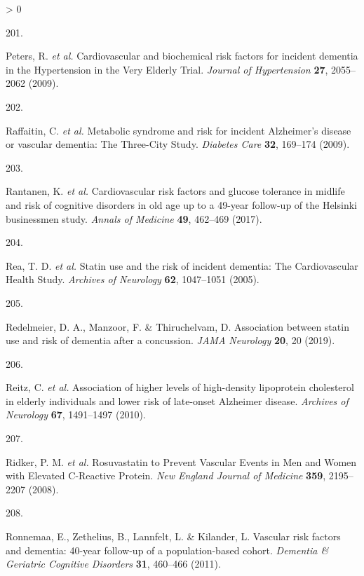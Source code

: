 \documentclass[a4paper, twoside]{templates/ociamthesis}
\newlength{\cslhangindent}
\newlength{\csllabelwidth}
\newenvironment{CSLReferences}[3] %
 {%
  \setlength{\parindent}{0pt}
  \ifodd #1 \everypar{\setlength{\hangindent}{\cslhangindent}}\ignorespaces\fi
  \ifnum #2 > 0
  \setlength{\parskip}{#2\baselineskip}
  \fi
 }%
 {}
\newcommand{\CSLLeftMargin}[1]{\parbox[t]{\maxof{\widthof{#1}}{\csllabelwidth}}{#1}}
\newcommand{\CSLRightInline}[1]{\parbox[t]{\linewidth - \csllabelwidth}{#1}}
\begin{document}
\begin{CSLReferences}{0}{0}
\leavevmode\hypertarget{ref-peters2009}{}%
\CSLLeftMargin{201. }
\CSLRightInline{Peters, R. \emph{et al.} Cardiovascular and biochemical risk factors for incident dementia in the {Hypertension} in the {Very Elderly Trial}. \emph{Journal of Hypertension} \textbf{27}, 2055--2062 (2009).}

\leavevmode\hypertarget{ref-raffaitin2009}{}%
\CSLLeftMargin{202. }
\CSLRightInline{Raffaitin, C. \emph{et al.} Metabolic syndrome and risk for incident {Alzheimer}'s disease or vascular dementia: The {Three}-{City Study}. \emph{Diabetes Care} \textbf{32}, 169--174 (2009).}

\leavevmode\hypertarget{ref-rantanen2017}{}%
\CSLLeftMargin{203. }
\CSLRightInline{Rantanen, K. \emph{et al.} Cardiovascular risk factors and glucose tolerance in midlife and risk of cognitive disorders in old age up to a 49-year follow-up of the {Helsinki} businessmen study. \emph{Annals of Medicine} \textbf{49}, 462--469 (2017).}

\leavevmode\hypertarget{ref-rea2005a}{}%
\CSLLeftMargin{204. }
\CSLRightInline{Rea, T. D. \emph{et al.} Statin use and the risk of incident dementia: The {Cardiovascular Health Study}. \emph{Archives of Neurology} \textbf{62}, 1047--1051 (2005).}

\leavevmode\hypertarget{ref-redelmeier2019}{}%
\CSLLeftMargin{205. }
\CSLRightInline{Redelmeier, D. A., Manzoor, F. \& Thiruchelvam, D. Association between statin use and risk of dementia after a concussion. \emph{JAMA Neurology} \textbf{20}, 20 (2019).}

\leavevmode\hypertarget{ref-reitz2010}{}%
\CSLLeftMargin{206. }
\CSLRightInline{Reitz, C. \emph{et al.} Association of higher levels of high-density lipoprotein cholesterol in elderly individuals and lower risk of late-onset {Alzheimer} disease. \emph{Archives of Neurology} \textbf{67}, 1491--1497 (2010).}

\leavevmode\hypertarget{ref-ridker2008}{}%
\CSLLeftMargin{207. }
\CSLRightInline{Ridker, P. M. \emph{et al.} Rosuvastatin to {Prevent Vascular Events} in {Men} and {Women} with {Elevated C}-{Reactive Protein}. \emph{New England Journal of Medicine} \textbf{359}, 2195--2207 (2008).}

\leavevmode\hypertarget{ref-ronnemaa2011}{}%
\CSLLeftMargin{208. }
\CSLRightInline{Ronnemaa, E., Zethelius, B., Lannfelt, L. \& Kilander, L. Vascular risk factors and dementia: 40-year follow-up of a population-based cohort. \emph{Dementia \& Geriatric Cognitive Disorders} \textbf{31}, 460--466 (2011).}


\end{CSLReferences}
\end{document}
